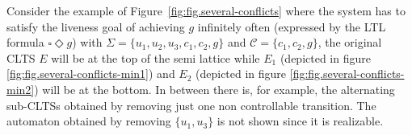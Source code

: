 Consider the example of Figure~\ref{fig:fig.several-conflicts} where the system has to satisfy the liveness goal of
achieving $g$ infinitely often (expressed
by the LTL formula $\square \Diamond g$)
with $\Sigma = \{u_1, u_2, u_3, c_1, c_2, g\}$ and 
$\mathcal{C} = \{c_1, c_2, g\}$, the original CLTS $E$ will be
at the top of the semi lattice while $E_1$ (depicted in figure \ref{fig:fig.several-conflicts-min1}) and $E_2$ (depicted in 
figure \ref{fig:fig.several-conflicts-min2}) will be at 
the bottom.  In between there is, for example, the alternating sub-CLTSs
obtained by removing just one non controllable transition.  
The automaton obtained by removing $\{u_1, u_3\}$ is not shown
since it is realizable. 
%
%
%



